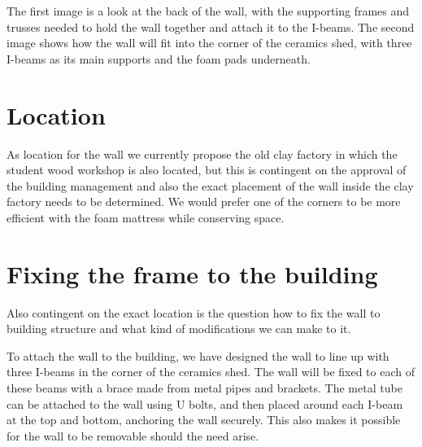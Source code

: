\documentclass{scrartcl}
\begin{document}
\begin{figure}[h]
\end{figure}

The first image is a look at the back of the wall, with the supporting frames and trusses needed to hold the wall together and attach it to the I-beams. The second image shows how the wall will fit into the corner of the ceramics shed, with three I-beams as its main supports and the foam pads underneath.

\section{Location}
As location for the wall we currently propose the old clay factory in which the student wood workshop is also located, but this is contingent on the approval of the building management and also the exact placement of the wall inside the clay factory needs to be determined. We would prefer one of the corners to be more efficient with the foam mattress while conserving space.

\section{Fixing the frame to the building}
Also contingent on the exact location is the question how to fix the wall to building structure and what kind of modifications we can make to it.

To attach the wall to the building, we have designed the wall to line up with three I-beams in the corner of the ceramics shed. The wall will be fixed to each of these beams with a brace made from metal pipes and brackets. The metal tube can be attached to the wall using U bolts, and then placed around each I-beam at the top and bottom, anchoring the wall securely. This also makes it possible for the wall to be removable should the need arise.
\end{document}
